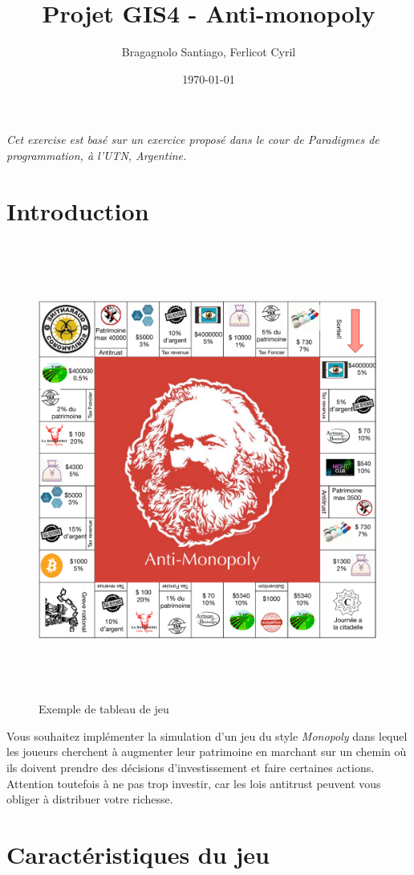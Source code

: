\documentclass[12pt]{article}
\author{
        Bragagnolo Santiago, Ferlicot Cyril
}
\title{Projet GIS4 - Anti-monopoly}
\date{\today}
\begin{document}
\maketitle
\emph{Cet exercise est basé sur un exercice proposé dans le cour de Paradigmes de programmation, à l'UTN, Argentine.}

\section{Introduction}

\begin{figure}
\includegraphics[width=15cm,height=15cm,keepaspectratio]{figures/board.pdf}
\caption{Exemple de tableau de jeu}
\label{fig:tableau}
\end{figure}

	Vous souhaitez implémenter la simulation d'un jeu du style \emph{Monopoly} dans lequel les joueurs cherchent
à augmenter leur patrimoine en marchant sur un chemin où ils doivent prendre des décisions 
d'investissement et faire certaines actions. Attention toutefois à ne pas trop investir, car 
les lois antitrust peuvent vous obliger à distribuer votre richesse.


\section{Caractéristiques du jeu}
\end{document}
